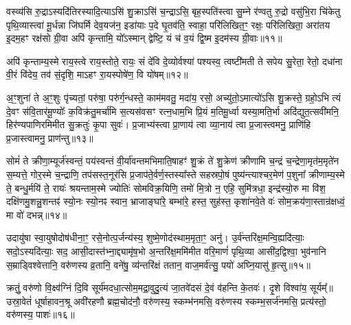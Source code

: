 वस्व्य॑सि रु॒द्रा\-ऽस्यदि॑तिरस्यादि॒त्या\-ऽसि॑ शु॒क्रा\-ऽसि॑ च॒न्द्रा\-ऽसि॒ बृह॒स्पति॑स्त्वा सु॒म्ने र॑ण्वतु रु॒द्रो वसु॑भि॒रा चि॑केतु पृथि॒व्यास्त्वा॑ मू॒र्धन्ना जि॑घर्मि देव॒यज॑न॒ इडा॑याः प॒दे घृ॒तव॑ति॒ स्वाहा॒ परि॑लिखित॒ꣳ॒ रक्षः॒ परि॑लिखिता॒ अरा॑तय इ॒दम॒हꣳ रक्ष॑सो ग्री॒वा अपि॑ कृन्तामि॒ यो᳚\-ऽस्मान् द्वेष्टि॒ यं च॑ व॒यं द्वि॒ष्म इ॒दम॑स्य ग्री॒वाः॥११॥

अपि॑ कृन्ताम्य॒स्मे राय॒स्त्वे राय॒स्तोते॒ रायः॒ सं दे॑वि दे॒व्योर्वश्या॑ पश्यस्व॒ त्वष्टी॑मती ते सपेय सु॒रेता॒ रेतो॒ दधा॑ना वी॒रं वि॑देय॒ तव॑ सं॒दृशि॒ मा\-ऽहꣳ रा॒यस्पोषे॑ण॒ वि यो॑षम्॥१२॥

{\anuvakamend[{अ॒स्य॒ ग्री॒वा एका॒न्नत्रि॒ꣳ॒शच्च॑॥५॥}]}

अ॒ꣳ॒शुना॑ ते अ॒ꣳ॒शुः पृ॑च्यतां॒ परु॑षा॒ परु॑र्ग॒न्धस्ते॒ काम॑मवतु॒ मदा॑य॒ रसो॒ अच्यु॑तो॒\-ऽमात्यो॑\-ऽसि शु॒क्रस्ते॒ ग्रहो॒\-ऽभि त्यं दे॒वꣳ स॑वि॒तार॑मू॒ण्योः᳚ क॒विक्र॑तु॒मर्चा॑मि स॒त्यस॑वसꣳ रत्न॒धाम॒भि प्रि॒यं म॒तिमू॒र्ध्वा यस्या॒मति॒र्भा अदि॑द्युत॒त्सवी॑मनि॒ हिर॑ण्यपाणिरमिमीत सु॒क्रतुः॑ कृ॒पा सुवः॑। प्र॒जाभ्य॑स्त्वा प्रा॒णाय॑ त्वा व्या॒नाय॑ त्वा प्र॒जास्त्वमनु॒ प्राणि॑हि प्र॒जास्त्वामनु॒ प्राण॑न्तु॥१३॥

{\anuvakamend[{अनु॑ स॒प्त च॑॥६॥}]}

सोमं॑ ते क्रीणा॒म्यूर्ज॑स्वन्तं॒ पय॑स्वन्तं वी॒र्या॑वन्तमभिमाति॒षाहꣳ॑ शु॒क्रं ते॑ शु॒क्रेण॑ क्रीणामि च॒न्द्रं च॒न्द्रेणा॒मृत॑म॒मृते॑न स॒म्यत्ते॒ गोर॒स्मे च॒न्द्राणि॒ तप॑सस्त॒नूर॑सि प्र॒जाप॑ते॒र्वर्ण॒स्तस्या᳚स्ते सहस्रपो॒षं पुष्य॑न्त्याश्चर॒मेण॑ प॒शुना᳚ क्रीणाम्य॒स्मे ते॒ बन्धु॒र्मयि॑ ते॒ रायः॑ श्रयन्ताम॒स्मे ज्योतिः॑ सोमविक्र॒यिणि॒ तमो॑ मि॒त्रो न॒ एहि॒ सुमि॑त्रधा॒ इन्द्र॑स्यो॒रु मा वि॑श॒ दक्षि॑णमु॒शन्नु॒शन्तꣴ॑ स्यो॒नः स्यो॒नꣴ स्वान॒ भ्राजाङ्घा॑रे॒ बम्भा॑रे॒ हस्त॒ सुह॑स्त॒ कृशा॑नवे॒ते वः॑ सोम॒क्रय॑णा॒स्तान्र॑क्षध्वं॒ मा वो॑ दभन्न्॥१४॥

{\anuvakamend[{ऊ॒रुं द्वाविꣳ॑शतिश्व॥७॥}]}

उदायु॑षा स्वा॒युषोदोष॑धीना॒ꣳ॒ रसे॒नोत्प॒र्जन्य॑स्य॒ शुष्मे॒णोद॑स्थाम॒मृता॒ꣳ॒ अनु॑। उ॒र्व॑न्तरि॑क्ष॒मन्वि॒ह्यदि॑त्याः॒ सदो॒\-ऽस्यदि॑त्याः॒ सद॒ आसी॒दास्त॑भ्ना॒द्द्यामृ॑ष॒भो अ॒न्तरि॑क्ष॒ममि॑मीत वरि॒माणं॑ पृथि॒व्या आसी॑द॒द्विश्वा॒ भुव॑नानि स॒म्राड्विश्वेत्तानि॒ वरु॑णस्य व्र॒तानि॒ वने॑षु॒ व्य॑न्तरि॑क्षं ततान॒ वाज॒मर्व॑त्सु॒ पयो॑ अघ्नि॒यासु॑ हृ॒त्सु॥१५॥

क्रतुं॒ वरु॑णो वि॒क्ष्व॑ग्निं दि॒वि सूर्य॑मदधा॒त्सोम॒मद्रा॒वुदु॒त्यं जा॒तवे॑दसं दे॒वं व॑हन्ति के॒तवः॑। दृ॒शे विश्वा॑य॒ सूर्यम्᳚॥ उस्रा॒वेतं॑ धूर्\mbox{}षाहावन॒श्रू अवी॑रहणौ ब्रह्म॒चोद॑नौ॒ वरु॑णस्य॒ स्कम्भ॑नमसि॒ वरु॑णस्य स्कम्भ॒सर्ज॑नमसि॒ प्रत्य॑स्तो॒ वरु॑णस्य॒ पाशः॑॥१६॥


